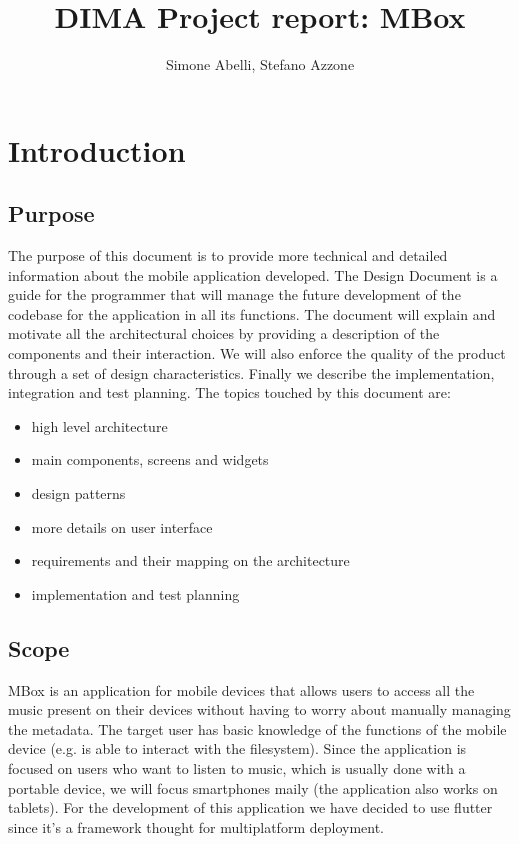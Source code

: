 \documentclass{article}
\author{Simone Abelli, Stefano Azzone}
\title{DIMA Project report: MBox}
\begin{document}
\maketitle
\newpage
\tableofcontents
\newpage
\section{Introduction}
\subsection{Purpose}
The purpose of this document is to provide more technical and detailed
information about the mobile application developed. The Design Document is a
guide for the programmer that will manage the future development of the codebase
for the application in all its functions. The document will explain and motivate
all the architectural choices by providing a description of the components and
their interaction. We will also enforce the quality of the product through a set
of design characteristics. Finally we describe the implementation, integration
and test planning.
The topics touched by this document are:
\begin{itemize}
	\item high level architecture
	\item main components, screens and widgets
	\item design patterns
	\item more details on user interface
	\item requirements and their mapping on the architecture
	\item implementation and test planning
\end{itemize}

\subsection{Scope}
MBox is an application for mobile devices that allows users to access all the
music present on their devices without having to worry about manually managing 
the metadata. The target user has basic knowledge of the functions of the
mobile device (e.g. is able to interact with the filesystem). Since the
application is focused on users who want to listen to music, which is usually
done with a portable device, we will focus smartphones maily (the application
also works on tablets). For the development of this application we have decided
to use flutter since it's a framework thought for multiplatform deployment.
\end{document}
